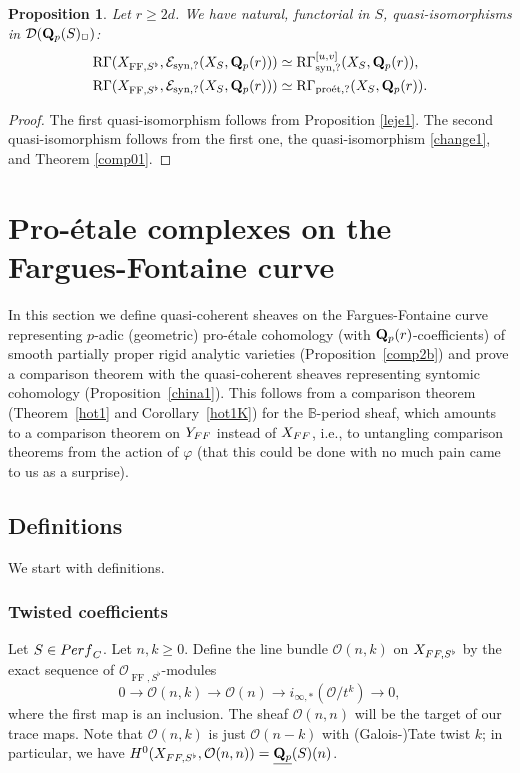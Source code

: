 \documentclass[10pt,reqno]{amsart}
\newtheorem{proposition}[equation]{Proposition}
\theoremstyle{definition}
\theoremstyle{remark}
\def\phi{\varphi}
\newcommand{\proeet}{\operatorname{pro\acute{e}t} }
\newcommand{\synt}{ \operatorname{syn} }
\newcommand{\FF}{\operatorname{FF} }
\newcommand{\so}{{\mathcal O}}
\newcommand{\se}{{\mathcal{E}}}
\newcommand{\sd}{{\mathcal{D}}}
\numberwithin{equation}{section}
\def\R{{\mathrm R}}
\def\Q{{\bf Q}} \def\Z{{\bf Z}}
\numberwithin{equation}{section}
\begin{document}
   \begin{proposition}\label{comp2}
Let $r\geq 2d$.  We have  natural, functorial in $S$,  quasi-isomorphisms in $\sd(\Q_{p}(S)_{\Box})$:
\begin{align*}
 \R\Gamma(X_{\FF,S^{\flat}},\se_{\synt,?}(X_S,\Q_p(r))) & \simeq\R\Gamma^{[u,v]}_{\synt,?}(X_S,\Q_p(r)),\\
\R\Gamma(X_{\FF,S^{\flat}},\se_{\synt,?}(X_S,\Q_p(r))) & \simeq\R\Gamma_{\proeet,?}(X_S,\Q_p(r)).
\end{align*}
 \end{proposition}
 \begin{proof}The first quasi-isomorphism follows from Proposition \ref{leje1}. The second quasi-isomorphism follows from the first one, the quasi-isomorphism \eqref{change1}, and Theorem \ref{comp01}.
 \end{proof}


 \section{Pro-\'etale  complexes on the Fargues-Fontaine curve}
In this section we define quasi-coherent sheaves on the Fargues-Fontaine curve representing
$p$-adic (geometric) pro-\'etale cohomology (with $\Q_p(r)$-coefficients)
of smooth partially proper rigid analytic varieties 
(Proposition~\ref{comp2b}) 
and prove a comparison theorem with the quasi-coherent sheaves representing syntomic cohomology
(Proposition~\ref{china1}).  This follows from a comparison theorem (Theorem~\ref{hot1} and Corollary~\ref{hot1K})
for the ${\mathbb B}$-period sheaf, which   amounts
to a comparison theorem on $Y_{\rm FF}$ instead of $X_{\rm FF}$, i.e., to untangling
comparison theorems from the action of $\phi$ (that this could be done with no much pain came to us as a surprise).

 
 \subsection{Definitions} We start with definitions. 
 
\subsubsection{Twisted coefficients} Let $S\in {\rm Perf}_C$. 
Let $n,k\geq 0$. Define the line bundle $\so(n,k)$ on $X_{\rm FF,S^{\flat}}$ by the exact sequence of $\so_{\FF, S^{\flat}}$-modules
$$
0\to \so(n,k)\to \so(n)\to i_{\infty, *}(\so/t^k)\to 0,
$$
where the first map is an inclusion. The sheaf $\so(n,n)$  will be the target of our trace maps. Note that  $\so(n,k)$ is just $\so(n-k)$ with (Galois-)Tate twist $k$; in particular, we have $H^0(X_{\rm FF,S^{\flat}},\so(n,n))=\underline{\Q_p}(S)(n)$. 
\end{document}
